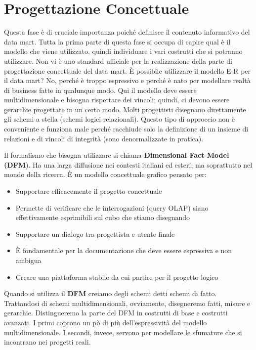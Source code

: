 \section{Progettazione Concettuale}
Questa fase è di cruciale importanza poiché definisce il contenuto informativo del data mart. Tutta la prima parte di questa fase si occupa di capire qual è il modello che viene utilizzato, quindi individuare i vari costrutti che si potranno utilizzare. Non vi è uno standard ufficiale per la realizzazione della parte di progettazione concettuale del data mart. È possibile utilizzare il modello E-R per il data mart? No, perché è troppo espressivo e perché è nato per modellare realtà di business fatte in qualunque modo. Qui il modello deve essere multidimensionale e bisogna rispettare dei vincoli; quindi, ci devono essere gerarchie progettate in un certo modo. Molti progettisti disegnano direttamente gli schemi a stella (schemi logici relazionali). Questo tipo di approccio non è conveniente e funziona male perché racchiude solo la definizione di un insieme di relazioni e di vincoli di integrità (sono denormalizzate in pratica). 

Il formalismo che bisogna utilizzare si chiama \textbf{Dimensional Fact Model (DFM}). Ha una larga diffusione nei contesti italiani ed esteri, ma soprattutto nel mondo della ricerca. È un modello concettuale grafico pensato per:
\begin{itemize}
	\item 
	Supportare efficacemente il progetto concettuale
	\item 
	Permette di verificare che le interrogazioni (query OLAP) siano effettivamente esprimibili sul cubo che stiamo disegnando 
	\item 
	Supportare un dialogo tra progettista e utente finale
	\item 
	È fondamentale per la documentazione che deve essere espressiva e non ambigua
	\item 
	Creare una piattaforma stabile da cui partire per il progetto logico
\end{itemize}

Quando si utilizza il \textbf{DFM} creiamo degli schemi detti schemi di fatto. Trattandosi di schemi multidimensionali, ovviamente, disegneremo fatti, misure e gerarchie. Distingueremo la parte del DFM in costrutti di base e costrutti avanzati. I primi coprono un pò di più dell’espressività del modello multidimensionale. I secondi, invece, servono per modellare le sfumature che si incontrano nei progetti reali. 
